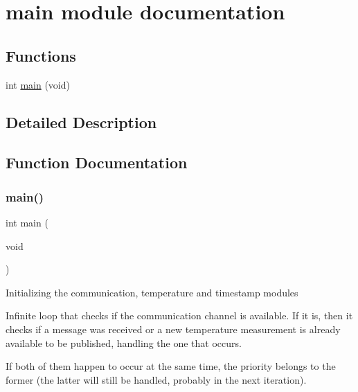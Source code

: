 \hypertarget{group__main__module}{}\section{main module documentation}
\label{group__main__module}
\subsection*{Functions}
\begin{DoxyCompactItemize}
\item 
int \hyperlink{group__main__module_ga840291bc02cba5474a4cb46a9b9566fe}{main} (void)
\end{DoxyCompactItemize}


\subsection{Detailed Description}


\subsection{Function Documentation}
\mbox{\label{group__main__module_ga840291bc02cba5474a4cb46a9b9566fe}} 
\subsubsection{\texorpdfstring{main()}{main()}}
{\footnotesize\ttfamily int main (\begin{DoxyParamCaption}\item[{void}]{ }\end{DoxyParamCaption})}

Initializing the communication, temperature and timestamp modules

Infinite loop that checks if the communication channel is available. If it is, then it checks if a message was received or a new temperature measurement is already available to be published, handling the one that occurs.

If both of them happen to occur at the same time, the priority belongs to the former (the latter will still be handled, probably in the next iteration).
